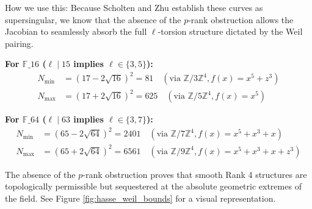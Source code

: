 \documentclass[letterpaper, 11pt]{article}
\begin{document}
How we use this: Because Scholten and Zhu establish these curves as supersingular, we know that the absence of the $p$-rank obstruction allows the Jacobian to seamlessly absorb the full $\ell$-torsion structure dictated by the Weil pairing. 

\textbf{For $\mathbb{F}\_{16}$ ($\ell \mid 15$ implies $\ell \in \{3, 5\}$):}
\begin{align*}
    N_{\text{min}} &= (17 - 2\sqrt{16})^2 = 81 \quad (\text{via } \mathbb{Z}/3\mathbb{Z}^4, f(x) = x^5 + z^3) \\
    N_{\text{max}} &= (17 + 2\sqrt{16})^2 = 625 \quad (\text{via } \mathbb{Z}/5\mathbb{Z}^4, f(x) = x^5)
\end{align*}

\textbf{For $\mathbb{F}\_{64}$ ($\ell \mid 63$ implies $\ell \in \{3, 7\}$):}
\begin{align*}
    N_{\text{min}} &= (65 - 2\sqrt{64})^2 = 2401 \quad (\text{via } \mathbb{Z}/7\mathbb{Z}^4, f(x) = x^5 + x^3 + x) \\
    N_{\text{max}} &= (65 + 2\sqrt{64})^2 = 6561 \quad (\text{via } \mathbb{Z}/9\mathbb{Z}^4, f(x) = x^5 + x^3 + x + z^3)
\end{align*}

The absence of the $p$-rank obstruction proves that smooth Rank 4 structures are topologically permissible but sequestered at the absolute geometric extremes of the field. See Figure \ref{fig:hasse_weil_bounds} for a visual representation.
\end{document}

